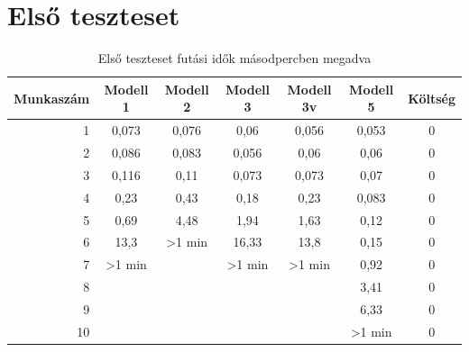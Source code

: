 \documentclass [12pt]{report}
\begin{document}
   \section{Első teszteset}
   \begin{table}[htpb]
   \centering
   \setlength{\tabcolsep}{4pt}
	\begin{tabular}{r|cccccc}
	   Munkaszám & Modell 1 & Modell 2 & Modell 3 & Modell 3v & Modell 5 & Költség \\ 
	   \hline 
	   1 & 0,073 & 0,076 & 0,06 & 0,056 & 0,053 & 0 \\ 
	   
	   2 & 0,086 & 0,083 & 0,056 & 0,06 & 0,06 & 0 \\ 
	   
	   3 & 0,116 & 0,11 & 0,073 & 0,073 & 0,07 & 0 \\ 
	   
	   4 & 0,23 & 0,43 & 0,18 & 0,23 & 0,083 & 0 \\ 
	  
	   5 & 0,69 & 4,48 & 1,94 & 1,63 & 0,12 & 0 \\ 
	
	   6 & 13,3 & >1 min & 16,33 & 13,8 & 0,15 & 0 \\ 
	   
	   7 & >1 min &  & >1 min & >1 min & 0,92 & 0 \\ 
	   
	   8 &  &  &  &  & 3,41 & 0 \\ 
	   
	   9 &  &  &  &  & 6,33 & 0 \\ 
	   
	   10 &  &  &  &  & >1 min & 0 \\ 
	  
	   \end{tabular} 
	   \label{tab:elsotablazat}
	    \caption{Első teszteset futási idők másodpercben megadva}
   \end{table}
   
\end{document}
